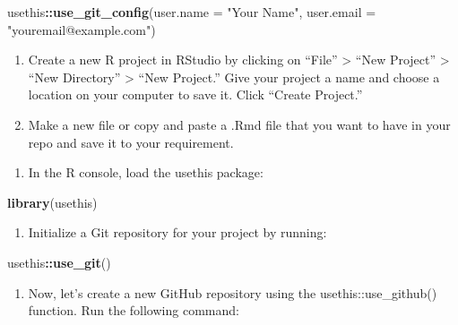 \documentclass[
]{book}
\newenvironment{Shaded}{\begin{snugshade}}{\end{snugshade}}
\newcommand{\AttributeTok}[1]{\textcolor[rgb]{0.13,0.29,0.53}{#1}}
\newcommand{\FunctionTok}[1]{\textcolor[rgb]{0.13,0.29,0.53}{\textbf{#1}}}
\newcommand{\NormalTok}[1]{#1}
\newcommand{\SpecialCharTok}[1]{\textcolor[rgb]{0.81,0.36,0.00}{\textbf{#1}}}
\newcommand{\StringTok}[1]{\textcolor[rgb]{0.31,0.60,0.02}{#1}}
\providecommand{\tightlist}{%
  \setlength{\itemsep}{0pt}\setlength{\parskip}{0pt}}
\begin{document}
\begin{Shaded}
\begin{Highlighting}[]
\NormalTok{usethis}\SpecialCharTok{::}\FunctionTok{use\_git\_config}\NormalTok{(}\AttributeTok{user.name =} \StringTok{"Your Name"}\NormalTok{, }\AttributeTok{user.email =} \StringTok{"youremail@example.com"}\NormalTok{)}
\end{Highlighting}
\end{Shaded}

\begin{enumerate}
\def\labelenumi{\arabic{enumi}.}
\setcounter{enumi}{3}
\item
  Create a new R project in RStudio by clicking on ``File'' \textgreater{} ``New Project'' \textgreater{} ``New Directory'' \textgreater{} ``New Project.'' Give your project a name and choose a location on your computer to save it. Click ``Create Project.''
\item
  Make a new file or copy and paste a .Rmd file that you want to have in your repo and save it to your requirement.
\end{enumerate}

\begin{enumerate}
\def\labelenumi{\arabic{enumi}.}
\setcounter{enumi}{5}
\tightlist
\item
  In the R console, load the usethis package:
\end{enumerate}

\begin{Shaded}
\begin{Highlighting}[]
\FunctionTok{library}\NormalTok{(usethis)}
\end{Highlighting}
\end{Shaded}

\begin{enumerate}
\def\labelenumi{\arabic{enumi}.}
\setcounter{enumi}{6}
\tightlist
\item
  Initialize a Git repository for your project by running:
\end{enumerate}

\begin{Shaded}
\begin{Highlighting}[]
\NormalTok{usethis}\SpecialCharTok{::}\FunctionTok{use\_git}\NormalTok{()}
\end{Highlighting}
\end{Shaded}

\begin{enumerate}
\def\labelenumi{\arabic{enumi}.}
\setcounter{enumi}{7}
\tightlist
\item
  Now, let's create a new GitHub repository using the usethis::use\_github() function. Run the following command:
\end{enumerate}
\end{document}
